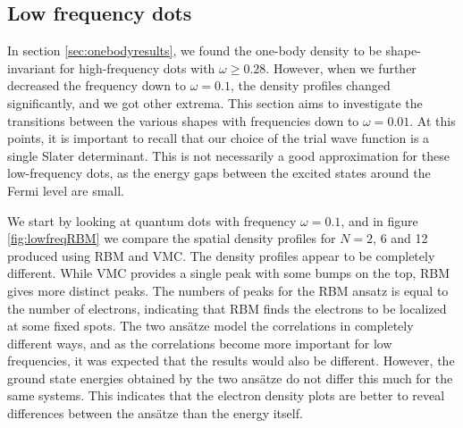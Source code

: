 \subsection{Low frequency dots} \label{sec:lowfrequencies}
In section \ref{sec:onebodyresults}, we found the one-body density to be shape-invariant for high-frequency dots with $\omega\geq0.28$. However, when we further decreased the frequency down to $\omega=0.1$, the density profiles changed significantly, and we got other extrema. This section aims to investigate the transitions between the various shapes with frequencies down to $\omega=0.01$. At this points, it is important to recall that our choice of the trial wave function is a single Slater determinant. This is not necessarily a good approximation for these low-frequency dots, as the energy gaps between the excited states around the Fermi level are small. 

We start by looking at quantum dots with frequency $\omega=0.1$, and in figure \eqref{fig:lowfreqRBM} we compare the spatial density profiles for $N=2$, 6 and 12 produced using RBM and VMC. The density profiles appear to be completely different. While VMC provides a single peak with some bumps on the top, RBM gives more distinct peaks. The numbers of peaks for the RBM ansatz is equal to the number of electrons, indicating that RBM finds the electrons to be localized at some fixed spots. The two ansätze model the correlations in completely different ways, and as the correlations become more important for low frequencies, it was expected that the results would also be different. However, the ground state energies obtained by the two ansätze do not differ this much for the same systems. This indicates that the electron density plots are better to reveal differences between the ansätze than the energy itself. 

